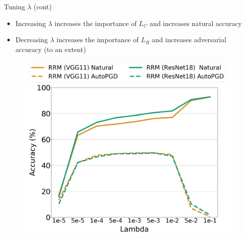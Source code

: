 \documentclass{beamer}
\begin{document}
\begin{frame}{Tuning $\lambda$ (cont)}
	
	\begin{itemize}
		\item Increasing $\lambda$ increases the importance of $L_C$ and increases natural accuracy
		\item Decreasing $\lambda$ increases the importance of $L_R$ and increases adversarial accuracy (to an extent)
	\end{itemize}

	\begin{figure}
		\centering
		\includegraphics[scale=.3]{./images/tuning_lambda.png}
		\caption{}
	\end{figure}
	
\end{frame}


\end{document}
